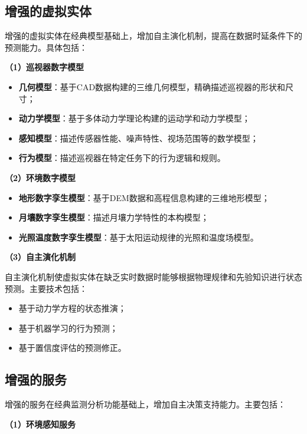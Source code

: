 \subsection{增强的虚拟实体}
\label{subsec:enhanced_ve}

增强的虚拟实体在经典模型基础上，增加自主演化机制，提高在数据时延条件下的预测能力。具体包括：

\textbf{（1）巡视器数字模型}

\begin{itemize}
    \item \textbf{几何模型}：基于CAD数据构建的三维几何模型，精确描述巡视器的形状和尺寸；
    \item \textbf{动力学模型}：基于多体动力学理论构建的运动学和动力学模型；
    \item \textbf{感知模型}：描述传感器性能、噪声特性、视场范围等的数学模型；
    \item \textbf{行为模型}：描述巡视器在特定任务下的行为逻辑和规则。
\end{itemize}

\textbf{（2）环境数字模型}

\begin{itemize}
    \item \textbf{地形数字孪生模型}：基于DEM数据和高程信息构建的三维地形模型；
    \item \textbf{月壤数字孪生模型}：描述月壤力学特性的本构模型；
    \item \textbf{光照温度数字孪生模型}：基于太阳运动规律的光照和温度场模型。
\end{itemize}

\textbf{（3）自主演化机制}

自主演化机制使虚拟实体在缺乏实时数据时能够根据物理规律和先验知识进行状态预测。主要技术包括：
\begin{itemize}
    \item 基于动力学方程的状态推演；
    \item 基于机器学习的行为预测；
    \item 基于置信度评估的预测修正。
\end{itemize}

\subsection{增强的服务}
\label{subsec:enhanced_services}

增强的服务在经典监测分析功能基础上，增加自主决策支持能力。主要包括：

\textbf{（1）环境感知服务}

